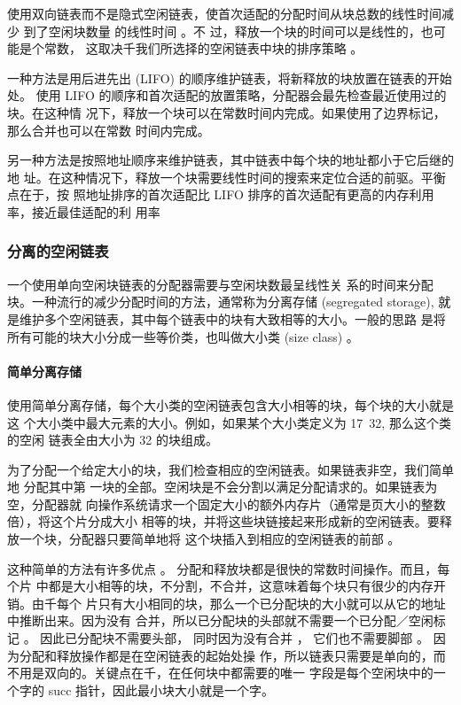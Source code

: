 使用双向链表而不是隐式空闲链表，使首次适配的分配时间从块总数的线性时间减少
到了空闲块数量 的线性时间 。不 过，释放一个块的时间可以是线性的，也可能是个常数，
这取决千我们所选择的空闲链表中块的排序策略 。

一种方法是用后进先出 (LIFO) 的顺序维护链表，将新释放的块放置在链表的开始处。
使用 LIFO 的顺序和首次适配的放置策略，分配器会最先检查最近使用过的块。在这种情
况下，释放一个块可以在常数时间内完成。如果使用了边界标记，那么合并也可以在常数
时间内完成。

另一种方法是按照地址顺序来维护链表，其中链表中每个块的地址都小于它后继的地
址。在这种情况下，释放一个块需要线性时间的搜索来定位合适的前驱。平衡点在于，按
照地址排序的首次适配比 LIFO 排序的首次适配有更高的内存利用率，接近最佳适配的利
用率

\subsubsection{分离的空闲链表}

一个使用单向空闲块链表的分配器需要与空闲块数最呈线性关
系的时间来分配块。一种流行的减少分配时间的方法，通常称为分离存储 (segregated
storage), 就是维护多个空闲链表，其中每个链表中的块有大致相等的大小。一般的思路
是将所有可能的块大小分成一些等价类，也叫做大小类 (size class) 。

\paragraph{简单分离存储}

使用简单分离存储，每个大小类的空闲链表包含大小相等的块，每个块的大小就是这
个大小类中最大元素的大小。例如，如果某个大小类定义为 { 17~32}, 那么这个类的空闲
链表全由大小为 32 的块组成。

为了分配一个给定大小的块，我们检查相应的空闲链表。如果链表非空，我们简单地
分配其中第 一块的全部。空闲块是不会分割以满足分配请求的。如果链表为空，分配器就
向操作系统请求一个固定大小的额外内存片（通常是页大小的整数倍），将这个片分成大小
相等的块，并将这些块链接起来形成新的空闲链表。要释放一个块，分配器只要简单地将
这个块插入到相应的空闲链表的前部 。

这种简单的方法有许多优点 。 分配和释放块都是很快的常数时间操作。而且，每个片
中都是大小相等的块，不分割，不合并，这意味着每个块只有很少的内存开销。由千每个
片只有大小相同的块，那么一个已分配块的大小就可以从它的地址中推断出来。因为没有
合并，所以已分配块的头部就不需要一个已分配／空闲标记 。 因此已分配块不需要头部，
同时因为没有合并 ， 它们也不需要脚部 。 因为分配和释放操作都是在空闲链表的起始处操
作，所以链表只需要是单向的，而不用是双向的。关键点在千，在任何块中都需要的唯一
字段是每个空闲块中的一个字的 succ 指针，因此最小块大小就是一个字。

